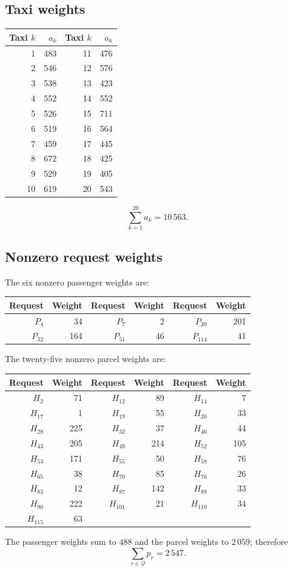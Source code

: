 \documentclass[11pt,a4paper]{article}
\newcommand{\Q}{\mathcal Q}
\begin{document}
\subsection{Taxi weights}
\begin{center}
\begin{tabular}{rr@{\qquad}rr}
\toprule
Taxi $k$ & $a_k$ & Taxi $k$ & $a_k$\\
\midrule
1 & 483 & 11 & 476 \\
2 & 546 & 12 & 576 \\
3 & 538 & 13 & 423 \\
4 & 552 & 14 & 552 \\
5 & 526 & 15 & 711 \\
6 & 519 & 16 & 564 \\
7 & 459 & 17 & 445 \\
8 & 672 & 18 & 425 \\
9 & 529 & 19 & 405 \\
10 & 619 & 20 & 543 \\
\bottomrule
\end{tabular}
\end{center}
\[
 \sum_{k=1}^{20}a_k=10\,563.
\]

\subsection{Nonzero request weights}
The six nonzero passenger weights are:
\begin{center}
\begin{tabular}{rr@{\qquad}rr@{\qquad}rr}
\toprule
Request & Weight & Request & Weight & Request & Weight\\
\midrule
$P_{4}$ & 34 & $P_{7}$ & 2 & $P_{20}$ & 201 \\
$P_{32}$ & 164 & $P_{51}$ & 46 & $P_{114}$ & 41 \\
\bottomrule
\end{tabular}
\end{center}
The twenty-five nonzero parcel weights are:
\begin{center}
\begin{tabular}{rr@{\qquad}rr@{\qquad}rr}
\toprule
Request & Weight & Request & Weight & Request & Weight\\
\midrule
$H_{2}$ & 71 & $H_{12}$ & 89 & $H_{14}$ & 7 \\
$H_{17}$ & 1 & $H_{19}$ & 55 & $H_{20}$ & 33 \\
$H_{28}$ & 225 & $H_{32}$ & 37 & $H_{40}$ & 44 \\
$H_{43}$ & 205 & $H_{49}$ & 214 & $H_{52}$ & 105 \\
$H_{53}$ & 171 & $H_{55}$ & 50 & $H_{58}$ & 76 \\
$H_{65}$ & 38 & $H_{70}$ & 85 & $H_{76}$ & 26 \\
$H_{83}$ & 12 & $H_{87}$ & 142 & $H_{89}$ & 33 \\
$H_{90}$ & 222 & $H_{101}$ & 21 & $H_{110}$ & 34 \\
$H_{115}$ & 63 &  &  &  &  \\
\bottomrule
\end{tabular}
\end{center}
The passenger weights sum to $488$ and the parcel weights to $2\,059$;
therefore
\[
 \sum_{r\in\Q}p_r=2\,547.
\]
\end{document}
